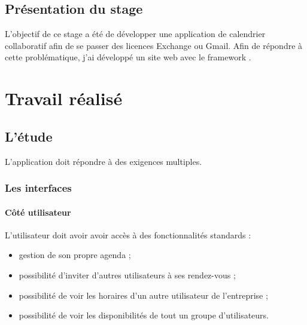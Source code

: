 \documentclass[a4paper, 11pt]{report}
\begin{document}
\section{Présentation du stage}
L'objectif de ce stage a été de développer une application de calendrier collaboratif afin de se passer des licences Exchange ou Gmail. Afin de répondre à cette problématique, j'ai développé un site web avec le framework \php \symfony.

\chapter{Travail réalisé}
\section{L'étude}
L'application doit répondre à des exigences multiples.
    \subsection{Les interfaces}
        \subsubsection{Côté utilisateur}
        L'utilisateur doit avoir avoir accès à des fonctionnalités standards :
        \begin{itemize}
            \item gestion de son propre agenda ;
            \item possibilité d'inviter d'autres utilisateurs à ses rendez-vous ;
            \item possibilité de voir les horaires d'un autre utilisateur de l'entreprise ;
            \item possibilité de voir les disponibilités de tout un groupe d'utilisateurs.
        \end{itemize}
\end{document}
